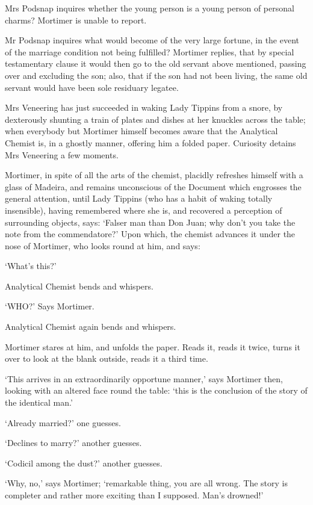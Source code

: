 Mrs Podsnap inquires whether the young person is a young person of
personal charms? Mortimer is unable to report.

Mr Podsnap inquires what would become of the very large fortune, in the
event of the marriage condition not being fulfilled? Mortimer replies,
that by special testamentary clause it would then go to the old servant
above mentioned, passing over and excluding the son; also, that if
the son had not been living, the same old servant would have been sole
residuary legatee.

Mrs Veneering has just succeeded in waking Lady Tippins from a snore, by
dexterously shunting a train of plates and dishes at her knuckles across
the table; when everybody but Mortimer himself becomes aware that the
Analytical Chemist is, in a ghostly manner, offering him a folded paper.
Curiosity detains Mrs Veneering a few moments.

Mortimer, in spite of all the arts of the chemist, placidly refreshes
himself with a glass of Madeira, and remains unconscious of the Document
which engrosses the general attention, until Lady Tippins (who has a
habit of waking totally insensible), having remembered where she is, and
recovered a perception of surrounding objects, says: ‘Falser man than
Don Juan; why don’t you take the note from the commendatore?’ Upon
which, the chemist advances it under the nose of Mortimer, who looks
round at him, and says:

‘What’s this?’

Analytical Chemist bends and whispers.

‘WHO?’ Says Mortimer.

Analytical Chemist again bends and whispers.

Mortimer stares at him, and unfolds the paper. Reads it, reads it twice,
turns it over to look at the blank outside, reads it a third time.

‘This arrives in an extraordinarily opportune manner,’ says Mortimer
then, looking with an altered face round the table: ‘this is the
conclusion of the story of the identical man.’

‘Already married?’ one guesses.

‘Declines to marry?’ another guesses.

‘Codicil among the dust?’ another guesses.

‘Why, no,’ says Mortimer; ‘remarkable thing, you are all wrong. The
story is completer and rather more exciting than I supposed. Man’s
drowned!’


